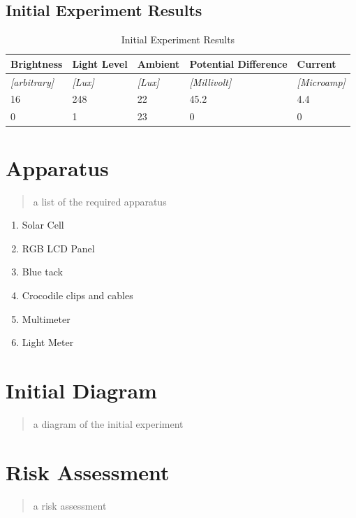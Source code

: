 \documentclass{article}
\begin{document}
\subsection{Initial Experiment Results}
\begin{table}[!ht]
\centering
\caption{Initial Experiment Results}
\label{Initial Experiment Results}
\begin{tabular}{|l|l|l|l|l|}
\hline
\textbf{Brightness}      & \textbf{Light Level} & \textbf{Ambient}   & \textbf{Potential Difference} & \textbf{Current}        \\ \hline
\textit{{[}arbitrary{]}} & \textit{{[}Lux{]}}   & \textit{{[}Lux{]}} & \textit{{[}Millivolt{]}}      & \textit{{[}Microamp{]}} \\ \hline
16                       & 248                  & 22                 & 45.2                          & 4.4                     \\ \hline
0                        & 1                    & 23                 & 0                             & 0                       \\ \hline
\end{tabular}
\end{table}



\section{Apparatus}
\begin{quote}
a list of the required apparatus
\end{quote}
\begin{enumerate}
  \item Solar Cell
  \item RGB LCD Panel
  \item Blue tack
  \item Crocodile clips and cables
  \item Multimeter
  \item Light Meter
\end{enumerate}

\section{Initial Diagram}
\begin{quote}
a diagram of the initial experiment
\end{quote}
\section{Risk Assessment}
\begin{quote}
a risk assessment
\end{quote}
\end{document}
